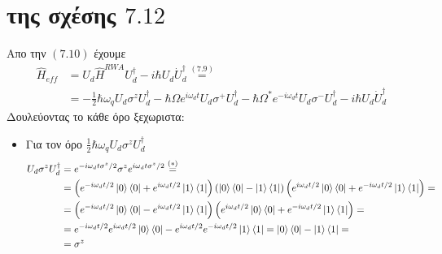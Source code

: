 \documentclass[12pt]{article}
\begin{document}
\section*{{ της σχέσης $7.12$}}
Aπο την $(7.10)$ έχουμε
\begin{align*}
    \hat{H}_{eff} &= U_d\hat{H}^{RWA}U_d^\dag - i\hbar U_d \dot{U}^\dag_d \stackrel{(7.9)}{=} \\
    &=-\frac{1}{2}\hbar \omega_qU_d\sigma^zU_d^\dag -\hbar\Omega e^{i \omega_d t}U_d\sigma^+U_d^\dag  -\hbar\Omega^* e^{-i \omega_d t}U_d\sigma^-U_d^\dag - i\hbar U_d \dot{U}^\dag_d
\end{align*}
Δουλεύοντας το κάθε όρο ξεχωριστα:
\begin{itemize}
    \item Για τον όρο $\frac{1}{2}\hbar \omega_qU_d\sigma^zU_d^\dag$
        \begin{align*}
            U_d\sigma^zU_d^\dag&=e^{-i\omega_d t \sigma^z/2}\sigma^z e^{i\omega_d t \sigma^z/2} \stackrel{(*)}{=}\\
            &= \left(e^{-i\omega_d t/2}\ket{0}\bra{0}+e^{i\omega_d t/2}\ket{1}\bra{1}\right)\left(\ket{0}\bra{0}-\ket{1}\bra{1}\right)\left(e^{i\omega_d t/2}\ket{0}\bra{0}+e^{-i\omega_d t/2}\ket{1}\bra{1}\right)=\\
            &=\left(e^{-i\omega_d t/2}\ket{0}\bra{0}-e^{i\omega_d t/2}\ket{1}\bra{1}\right)\left(e^{i\omega_d t/2}\ket{0}\bra{0}+e^{-i\omega_d t/2}\ket{1}\bra{1}\right)=\\
            &=e^{-i\omega_d t/2}e^{i\omega_d t/2}\ket{0}\bra{0}-e^{i\omega_d t/2}e^{-i\omega_d t/2}\ket{1}\bra{1} = \ket{0}\bra{0} - \ket{1}\bra{1} =\\
            &= \sigma^z
        \end{align*}


\end{itemize}
\end{document}

